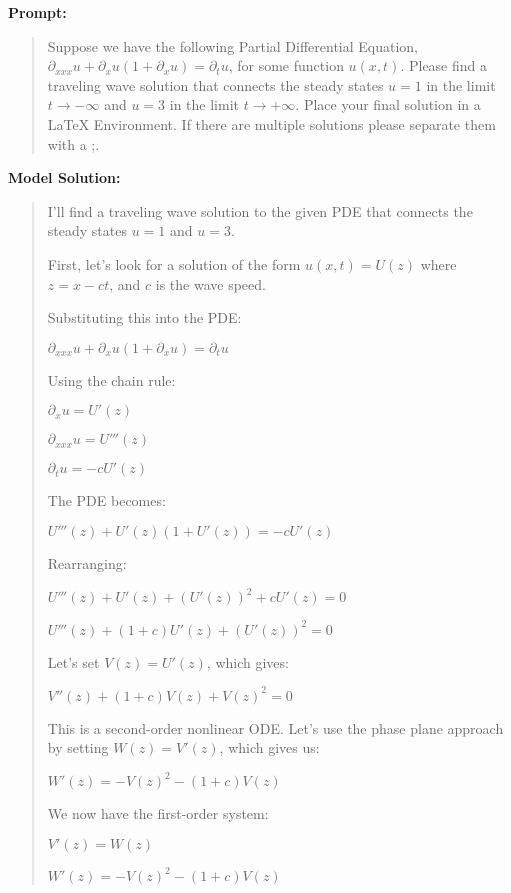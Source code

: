 \documentclass{article}
\begin{document}
\textbf{Prompt:}
\begin{quote}
Suppose we have the following Partial Differential Equation, $\partial_{xxx}u + \partial_xu(1+\partial_xu) = \partial_tu$, for some function $u(x,t)$. Please find a traveling wave solution that connects the steady states $u = 1$ in the limit $t \rightarrow -\infty $ and $u = 3$ in the limit $t \rightarrow +\infty$. Place your final solution in a $\boxed{}$ LaTeX Environment. If there are multiple solutions please separate them with a ;.
\end{quote}
\textbf{Model Solution:}
\begin{quote}
I'll find a traveling wave solution to the given PDE that connects the steady states $u=1$ and $u=3$.



First, let's look for a solution of the form $u(x,t) = U(z)$ where $z = x - ct$, and $c$ is the wave speed.



Substituting this into the PDE:

$\partial_{xxx}u + \partial_xu(1+\partial_xu) = \partial_tu$



Using the chain rule:

$\partial_x u = U'(z)$

$\partial_{xxx}u = U'''(z)$

$\partial_t u = -cU'(z)$



The PDE becomes:

$U'''(z) + U'(z)(1+U'(z)) = -cU'(z)$



Rearranging:

$U'''(z) + U'(z) + (U'(z))^2 + cU'(z) = 0$

$U'''(z) + (1+c)U'(z) + (U'(z))^2 = 0$



Let's set $V(z) = U'(z)$, which gives:

$V''(z) + (1+c)V(z) + V(z)^2 = 0$



This is a second-order nonlinear ODE. Let's use the phase plane approach by setting $W(z) = V'(z)$, which gives us:

$W'(z) = -V(z)^2 - (1+c)V(z)$



We now have the first-order system:

$V'(z) = W(z)$

$W'(z) = -V(z)^2 - (1+c)V(z)$




\end{quote}
\end{document}
